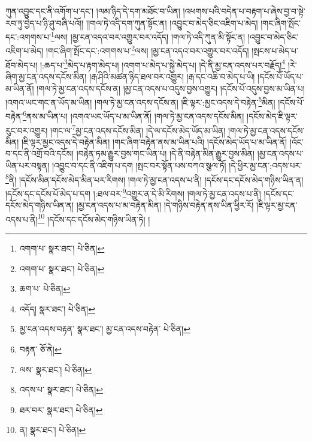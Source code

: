 ཀུན་འབྱུང་དང་ནི་འགོག་པ་དང་། །ལམ་ཉིད་དེ་དག་མཐོང་བ་ཡིན། །འཕགས་པའི་བདེན་པ་བརྟག་པ་ཞེས་བྱ་བ་སྟེ་རབ་ཏུ་བྱེད་པ་ཉི་ཤུ་བཞི་པའོ།། །།གལ་ཏེ་འདི་དག་ཀུན་སྟོང་ན། །འབྱུང་བ་མེད་ཅིང་འཇིག་པ་མེད། །གང་ཞིག་སྤོང་དང་:འགགས་པ་\footnote{འགག་པ་  སྣར་ཐང་།  པེ་ཅིན། }ལས། །མྱ་ངན་འདའ་བར་འགྱུར་བར་འདོད། །གལ་ཏེ་འདི་ཀུན་མི་སྟོང་ན། །འབྱུང་བ་མེད་ཅིང་འཇིག་པ་མེད། །གང་ཞིག་སྤོང་དང་:འགགས་པ་\footnote{འགག་པ་  སྣར་ཐང་།  པེ་ཅིན། }ལས། །མྱ་ངན་འདའ་བར་འགྱུར་བར་འདོད། །སྤངས་པ་མེད་པ་ཐོབ་མེད་པ། །:ཆད་པ་\footnote{ཆག་པ་  པེ་ཅིན། }མེད་པ་རྟག་མེད་པ། །འགག་པ་མེད་པ་སྐྱེ་མེད་པ། །དེ་ནི་མྱ་ངན་འདས་པར་བརྗོད།\footnote{འདོད།  སྣར་ཐང་།  པེ་ཅིན། } །རེ་ཞིག་མྱ་ངན་འདས་དངོས་མིན། །རྒ་ཤིའི་མཚན་ཉིད་ཐལ་བར་འགྱུར། །རྒ་དང་འཆི་བ་མེད་པ་ཡི། །དངོས་པོ་ཡོད་པ་མ་ཡིན་ནོ། །གལ་ཏེ་མྱ་ངན་འདས་དངོས་ན། །མྱ་ངན་འདས་པ་འདུས་བྱས་འགྱུར། །དངོས་པོ་འདུས་བྱས་མ་ཡིན་པ། །འགའ་ཡང་གང་ན་ཡོད་མ་ཡིན། །གལ་ཏེ་མྱ་ངན་འདས་དངོས་ན། །ཇི་ལྟར་:མྱང་འདས་དེ་བརྟེན་\footnote{མྱ་ངན་འདས་བརྟན་  སྣར་ཐང་། མྱ་ངན་འདས་བརྟེན་  པེ་ཅིན། }མིན། །དངོས་པོ་བརྟེན་\footnote{བརྟན་  ཅོ་ནེ། }ནས་མ་ཡིན་པ། །འགའ་ཡང་ཡོད་པ་མ་ཡིན་ནོ། །གལ་ཏེ་མྱ་ངན་འདས་དངོས་མིན། །དངོས་མེད་ཇི་ལྟར་རུང་བར་འགྱུར། །གང་ལ་\footnote{ལས་  སྣར་ཐང་།  པེ་ཅིན། }མྱ་ངན་འདས་དངོས་མིན། །དེ་ལ་དངོས་མེད་ཡོད་མ་ཡིན། །གལ་ཏེ་མྱ་ངན་འདས་དངོས་མིན། །ཇི་ལྟར་མྱང་འདས་དེ་བརྟེན་མིན། །གང་ཞིག་བརྟེན་ནས་མ་ཡིན་པའི། །དངོས་མེད་ཡོད་པ་མ་ཡིན་ནོ། །འོང་བ་དང་ནི་འགྲོ་བའི་དངོས། །བརྟེན་ཏམ་རྒྱུར་བྱས་གང་ཡིན་པ། །དེ་ནི་བརྟེན་མིན་རྒྱུར་བྱས་མིན། །མྱ་ངན་འདས་པ་ཡིན་པར་བསྟན། །འབྱུང་བ་དང་ནི་འཇིག་པ་དག །སྤང་བར་སྟོན་པས་བཀའ་སྩལ་ཏོ། །དེ་ཕྱིར་མྱ་ངན་:འདས་པར་\footnote{འདས་པ་  སྣར་ཐང་།  པེ་ཅིན། }ནི། །དངོས་མིན་དངོས་མེད་མིན་པར་རིགས། །གལ་ཏེ་མྱ་ངན་འདས་པ་ནི། །དངོས་དང་དངོས་མེད་གཉིས་ཡིན་ན། །དངོས་དང་དངོས་པོ་མེད་པ་དག །:ཐལ་བར་\footnote{ཐར་བར་  སྣར་ཐང་།  པེ་ཅིན། }འགྱུར་ན་དེ་མི་རིགས། །གལ་ཏེ་མྱ་ངན་འདས་པ་ནི། །དངོས་དང་དངོས་མེད་གཉིས་ཡིན་ན། །མྱ་ངན་འདས་པ་མ་བརྟེན་མིན། །དེ་གཉིས་བརྟེན་ནས་ཡིན་ཕྱིར་རོ། །ཇི་ལྟར་མྱ་ངན་འདས་པ་ནི།\footnote{ན།  སྣར་ཐང་།  པེ་ཅིན། } །དངོས་དང་དངོས་མེད་གཉིས་ཡིན་ཏེ། །
